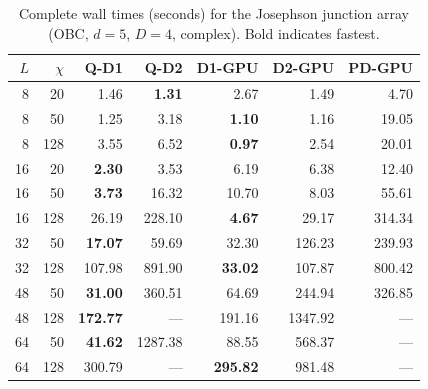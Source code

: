 \documentclass[preprint,12pt]{elsarticle}
\begin{document}
\begin{table}[h]
\centering
\caption{Complete wall times (seconds) for the Josephson junction array (OBC, $d = 5$, $D = 4$, complex).  Bold indicates fastest.}
\label{tab:full_josephson}
\begin{tabular}{rr|rr|rrr}
\toprule
$L$ & $\chi$ & Q-D1 & Q-D2 & D1-GPU & D2-GPU & PD-GPU \\
\midrule
8  & 20  & 1.46 & \textbf{1.31} & 2.67 & 1.49 & 4.70 \\
8  & 50  & 1.25 & 3.18 & \textbf{1.10} & 1.16 & 19.05 \\
8  & 128 & 3.55 & 6.52 & \textbf{0.97} & 2.54 & 20.01 \\
16 & 20  & \textbf{2.30} & 3.53 & 6.19 & 6.38 & 12.40 \\
16 & 50  & \textbf{3.73} & 16.32 & 10.70 & 8.03 & 55.61 \\
16 & 128 & 26.19 & 228.10 & \textbf{4.67} & 29.17 & 314.34 \\
32 & 50  & \textbf{17.07} & 59.69 & 32.30 & 126.23 & 239.93 \\
32 & 128 & 107.98 & 891.90 & \textbf{33.02} & 107.87 & 800.42 \\
48 & 50  & \textbf{31.00} & 360.51 & 64.69 & 244.94 & 326.85 \\
48 & 128 & \textbf{172.77} & --- & 191.16 & 1347.92 & --- \\
64 & 50  & \textbf{41.62} & 1287.38 & 88.55 & 568.37 & --- \\
64 & 128 & 300.79 & --- & \textbf{295.82} & 981.48 & --- \\
\bottomrule
\end{tabular}
\end{table}
\end{document}
